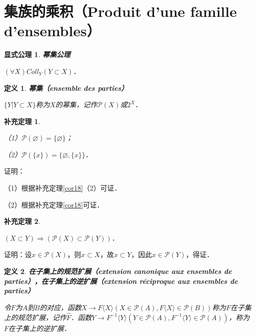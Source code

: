 \documentclass[12pt, a4paper, oneside]{book}
\newtheorem{ex}{显式公理}
\newtheorem{cor}{补充定理}
\newtheorem{de}{定义}
\begin{document}
		\section{集族的乘积（Produit d'une famille d'ensembles）}

			\begin{ex}\label{ex3}
				\textbf{幂集公理}
				\par
				$(\forall X)Coll_Y(Y\subset X)$．
			\end{ex}
			
			\begin{de}
				\textbf{幂集（ensemble des parties）}
				\par
				$\{Y|Y\subset X\}$称为$X$的幂集，记作$ \mathcal{P}(X)$或$2^X$．
			\end{de}

			\begin{cor}\label{cor117}
				\hfill\par
				（1）$ \mathcal{P}(\varnothing)=\{\varnothing\}$；
				\par 
				（2）$ \mathcal{P}(\{x\})=\{\varnothing, \{x\}\}$．
			\end{cor}
			证明：
			\par
			（1）根据补充定理\ref{cor18}（2）可证．
			\par
			（2）根据补充定理\ref{cor18}可证．

			\begin{cor}\label{cor118}
				\hfill\par
				$(X\subset Y)\Rightarrow( \mathcal{P}(X)\subset \mathcal{P}(Y))$．
			\end{cor}
			证明：设$x\in \mathcal{P}(X)$，则$x\subset X$，故$x\subset Y$，因此$x\in \mathcal{P}(Y)$，得证．
			
			\begin{de}
				\textbf{在子集上的规范扩展（extension canonique aux ensembles de parties），在子集上的逆扩展（extension réciproque aux ensembles de parties）}
				\par
				令$F$为$A$到$B$的对应，函数$X\to F\langle X \rangle (X\in \mathcal{P}(A), F\langle X \rangle \in \mathcal{P}(B))$称为$F$在子集上的规范扩展，记作$\hat{F}$．函数$Y\to F^{-1}\langle Y \rangle (Y\in \mathcal{P}(A), F^{-1}\langle Y \rangle \in \mathcal{P}(A))$，称为$F$在子集上的逆扩展．
			\end{de}
			
\end{document}
